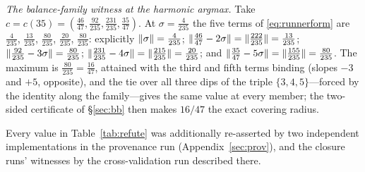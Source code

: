 \emph{The balance-family witness at the harmonic argmax.} Take
$c=c(35)=(\tfrac{46}{47},\tfrac{92}{235},\tfrac{231}{235},
\tfrac{35}{47})$. At $\sigma=\tfrac{4}{235}$ the five terms of
\eqref{eq:runnerform} are $\tfrac{4}{235}$, $\tfrac{13}{235}$,
$\tfrac{80}{235}$, $\tfrac{20}{235}$, $\tfrac{80}{235}$: explicitly
$\lVert \sigma \rVert=\tfrac4{235}$;
$\lVert \tfrac{46}{47}-2\sigma \rVert=\lVert \tfrac{222}{235} \rVert=\tfrac{13}{235}$;
$\lVert \tfrac{92}{235}-3\sigma \rVert=\tfrac{80}{235}$;
$\lVert \tfrac{231}{235}-4\sigma \rVert=\lVert \tfrac{215}{235} \rVert=\tfrac{20}{235}$;
and $\lVert \tfrac{35}{47}-5\sigma \rVert=\lVert \tfrac{155}{235} \rVert=\tfrac{80}{235}$.
The maximum is $\tfrac{80}{235}=\tfrac{16}{47}$, attained with the
third and fifth terms binding (slopes $-3$ and $+5$, opposite), and the
tie over all three dips of the triple $\{3,4,5\}$---forced by the
identity along the family---gives the same value at every member; the
two-sided certificate of \S\ref{sec:bb} then makes $16/47$ the exact
covering radius.

Every value in
Table~\ref{tab:refute} was additionally re-asserted by two independent
implementations in the provenance run (Appendix~\ref{sec:prov}), and
the closure runs' witnesses by the cross-validation run described
there.
